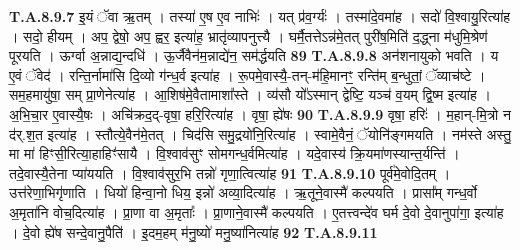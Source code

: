 \documentclass[17pt]{extarticle}
\begin{document}
                  \newline
                                                                  \textbf{ T.A.8.9.7} \newline
                  इ॒यं ॅवा ऋ॒तम् । तस्या॑ ए॒ष ए॒व नाभिः॑ । यत् प्र॑व॒र्ग्यः॑ । तस्मा॑दे॒वमा॑ह । सदो॑ वि॒श्वायु॒रित्या॑ह । सदो॒ हीयम् । अप॒ द्वेषो॒ अप॒ ह्वर॒ इत्या॑ह॒ भ्रातृ॑व्यापनुत्त्यै । घर्मै॒तत्तेऽन्न॑मे॒तत् पुरी॑ष॒मिति॑ द॒द्ध्ना म॑धुमि॒श्रेण॑ पूरयति ।  ऊर्ग्वा अ॒न्नाद्य॒न्दधि॑ । ऊ॒र्जैवैन॑म॒न्नाद्ये॑न॒ सम॑र्द्धयति \textbf{ 89} \newline
                  \newline
                                                                  \textbf{ T.A.8.9.8} \newline
                  अन॑शनायुको भवति । य ए॒वं ॅवेद॑ ।  रन्ति॒र्नामा॑सि दि॒व्यो ग॑न्ध॒र्व इत्या॑ह ।  रू॒पमे॒वास्यै॒-तन्-म॑हि॒मानꣳ॒॒ रन्ति॑म् ब॒न्धुतां॒ ॅव्याच॑ष्टे । सम॒हमायु॑षा॒ सम् प्रा॒णेनेत्या॑ह । आ॒शिष॑मे॒वैतामाशा᳚स्ते ।  व्य॑सौ यो᳚ऽस्मान् द्वेष्टि॒ यञ्च॑ व॒यम् द्वि॒ष्म इत्या॑ह । अ॒भि॒चा॒र ए॒वास्यै॒षः । अचि॑क्रद॒द्-वृषा॒ हरि॒रित्या॑ह । वृषा॒ ह्ये॑षः \textbf{ 90} \newline
                  \newline
                                                                  \textbf{ T.A.8.9.9} \newline
                  वृषा॒ हरिः॑ । म॒हान्-मि॒त्रो न द॑र्.श॒त इत्या॑ह । स्तौत्ये॒वैन॑मे॒तत् । चिद॑सि समु॒द्रयो॑नि॒रित्या॑ह । स्वामे॒वैनं॒ ॅयोनि॑ङ्गमयति ।  नम॑स्ते अस्तु॒ मा मा॑ हिꣳसी॒रित्या॒हाहिꣳ॑सायै ।  वि॒श्वाव॑सुꣳ सोमगन्ध॒र्वमित्या॑ह । यदे॒वास्य॑ क्रि॒यमा॑णस्यान्त॒र्यन्ति॑ । तदे॒वास्यै॒तेना प्या॑ययति ।  वि॒श्वाव॑सुर॒भि तन्नो॑ गृणा॒त्वित्या॑ह \textbf{ 91} \newline
                  \newline
                                                                  \textbf{ T.A.8.9.10} \newline
                  पूर्व॑मे॒वोदि॒तम् । उत्त॑रेणा॒भिगृ॑णाति ।  धियो॑ हिन्वा॒नो धिय॒ इन्नो॑ अव्या॒दित्या॑ह । ऋ॒तूने॒वास्मै॑ कल्पयति । प्रासा᳚म् गन्ध॒र्वो अ॒मृता॑नि वोच॒दित्या॑ह । प्रा॒णा वा अ॒मृताः᳚ ।  प्रा॒णाने॒वास्मै॑ कल्पयति । ए॒तत्त्वन्दे॑व घर्म दे॒वो दे॒वानुपा॑गा॒ इत्या॑ह । दे॒वो ह्ये॑ष सन्दे॒वानु॒पैति॑ । इ॒दम॒हम् म॑नु॒ष्यो॑ मनु॒ष्या॑नित्या॑ह \textbf{ 92} \newline
                  \newline
                                                                  \textbf{ T.A.8.9.11} \newline
\end{document}
